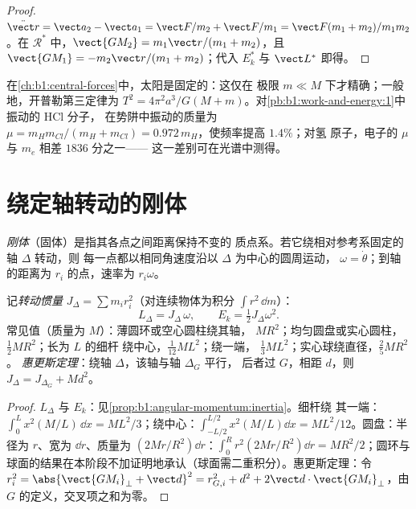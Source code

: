 \begin{proof}
$\ddot{\vect r} = \vect a_2 - \vect a_1 = \vect F/m_2 + \vect F/m_1 = \vect F(m_1 +
m_2)/m_1m_2$。在 $\mathcal R^*$ 中，$\vect{GM_2} = m_1\vect r/(m_1 + m_2)$，且
$\vect{GM_1} = -m_2\vect r/(m_1 + m_2)$；代入 $E_k^*$ 与 $\vect L^*$ 即得。
\end{proof}

\begin{example}[当中心也运动时]\label{ex:b1:systems-of-points:reduced}
在\cref{ch:b1:central-forces}中，太阳是固定的：这仅在
极限 $m \ll M$ 下才精确；一般地，开普勒第三定律为 $T^2 = 4\pi^2a^3/G(M +
m)$。对\cref{pb:b1:work-and-energy:1}中振动的 HCl 分子，
在势阱中振动的质量为 $\mu = m_Hm_{Cl}/(m_H + m_{Cl}) =
0.972\,m_H$，使频率提高 $1.4\%$；对氢
原子，电子的 $\mu$ 与 $m_e$ 相差 $1836$ 分之一——
这一差别可在光谱中测得。
\end{example}

\section{绕定轴转动的刚体}

\begin{definition}[固体；绕定轴转动]\label{def:b1:systems-of-points:solid}
\emph{刚体}（固体）是指其各点之间距离保持不变的
质点系。若它绕相对参考系固定的轴 $\Delta$ 转动，则
每一点都以相同角速度沿以 $\Delta$ 为中心的圆周运动，
$\omega = \dot\theta$；到轴的距离为 $r_i$ 的点，速率为
$r_i\omega$。
\end{definition}

\begin{proposition}\label{prop:b1:systems-of-points:inertia}
记\emph{转动惯量} $J_\Delta = \sum m_ir_i^2$（对连续物体为积分
$\int r^2\,\dd m$）：
\[
L_\Delta = J_\Delta\,\omega, \qquad E_k = \tfrac12 J_\Delta\omega^2 .
\]
常见值（质量为 $M$）：薄圆环或空心圆柱绕其轴，
$MR^2$；均匀圆盘或实心圆柱，$\tfrac12 MR^2$；长为 $L$ 的细杆
绕中心，$\tfrac{1}{12}ML^2$；绕一端，
$\tfrac13 ML^2$；实心球绕直径，$\tfrac25 MR^2$。
\emph{惠更斯定理}：绕轴 $\Delta$，该轴与轴 $\Delta_G$ 平行，
后者过 $G$，相距 $d$，则 $J_\Delta = J_{\Delta_G} + Md^2$。
\end{proposition}

\begin{proof}
$L_\Delta$ 与 $E_k$：见\cref{prop:b1:angular-momentum:inertia}。细杆绕
其一端：$\int_0^L x^2(M/L)\,\dd x = ML^2/3$；绕中心：$\int_{-L/2}^{L/2}
x^2(M/L)\dd x = ML^2/12$。圆盘：半径为 $r$、宽为 $\dd r$、质量为
$(2Mr/R^2)\dd r$：$\int_0^R r^2(2Mr/R^2)\dd r = MR^2/2$；圆环与
球面的结果在本阶段不加证明地承认（球面需二重积分）。惠更斯定理：令
$r_i^2 = \abs{\vect{GM_i}_\perp + \vect d}^2 = r_{G,i}^2 + d^2 + 2\vect d\cdot
\vect{GM_i}_\perp$，由 $G$ 的定义，交叉项之和为零。
\end{proof}

